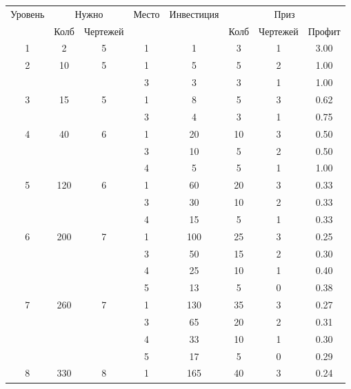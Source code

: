 \begin{longtable}[c]{|c|c|c|c|c|c|c|c|}
    \hline
    \multirow{ 2}{*}{\small Уровень} &
    \multicolumn{2}{|c|}{\small Нужно} &
    \multirow{ 2}{*}{\small Место} & 
    \multirow{ 2}{*}{\small Инвестиция} & 
    \multicolumn{3}{|c|}{\small Приз} \\\cline{2-3}\cline{6-8}
    &
    {\small Колб} & 
    {\small Чертежей} & 
    & &
    {\small Колб} & 
    {\small Чертежей} & 
    {\small Профит}
    \\\hline\endhead
    \multirow{1}{*}{1} & \multirow{1}{*}{2} & \multirow{1}{*}{5} & 1 & 1 & 3 & 1 & 3.00 \\\hline
    \multirow{2}{*}{2} & \multirow{2}{*}{10} & \multirow{2}{*}{5} & 1 & 5 & 5 & 2 & 1.00 \\\cline{4-8}
    & & & 3 & 3 & 3 & 1 & 1.00 \\\hline
    \multirow{2}{*}{3} & \multirow{2}{*}{15} & \multirow{2}{*}{5} & 1 & 8 & 5 & 3 & 0.62 \\\cline{4-8}
    & & & 3 & 4 & 3 & 1 & 0.75 \\\hline
    \multirow{3}{*}{4} & \multirow{3}{*}{40} & \multirow{3}{*}{6} & 1 & 20 & 10 & 3 & 0.50 \\\cline{4-8}
    & & & 3 & 10 & 5 & 2 & 0.50 \\\cline{4-8}
    & & & 4 & 5 & 5 & 1 & 1.00 \\\hline
    \multirow{3}{*}{5} & \multirow{3}{*}{120} & \multirow{3}{*}{6} & 1 & 60 & 20 & 3 & 0.33 \\\cline{4-8}
    & & & 3 & 30 & 10 & 2 & 0.33 \\\cline{4-8}
    & & & 4 & 15 & 5 & 1 & 0.33 \\\hline
    \multirow{4}{*}{6} & \multirow{4}{*}{200} & \multirow{4}{*}{7} & 1 & 100 & 25 & 3 & 0.25 \\\cline{4-8}
    & & & 3 & 50 & 15 & 2 & 0.30 \\\cline{4-8}
    & & & 4 & 25 & 10 & 1 & 0.40 \\\cline{4-8}
    & & & 5 & 13 & 5 & 0 & 0.38 \\\hline
    \multirow{4}{*}{7} & \multirow{4}{*}{260} & \multirow{4}{*}{7} & 1 & 130 & 35 & 3 & 0.27 \\\cline{4-8}
    & & & 3 & 65 & 20 & 2 & 0.31 \\\cline{4-8}
    & & & 4 & 33 & 10 & 1 & 0.30 \\\cline{4-8}
    & & & 5 & 17 & 5 & 0 & 0.29 \\\hline
    \multirow{4}{*}{8} & \multirow{4}{*}{330} & \multirow{4}{*}{8} & 1 & 165 & 40 & 3 & 0.24 \\\cline{4-8}

\end{longtable}
